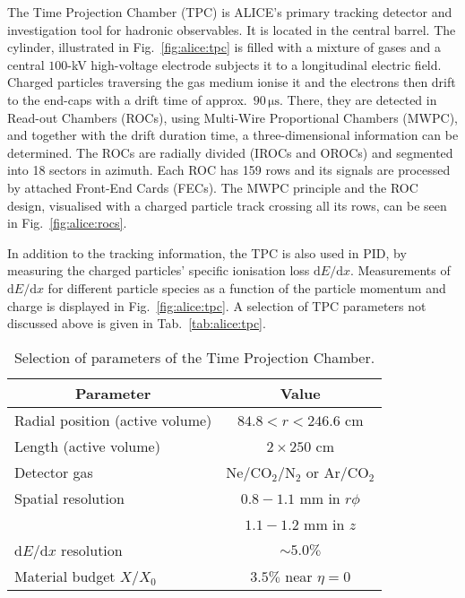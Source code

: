 The Time Projection Chamber (TPC) \cite{peskovTechnicalDesignReport2014} is ALICE's primary tracking detector and investigation tool for hadronic observables. It is located in the central barrel. The cylinder, illustrated in Fig.~\ref{fig:alice:tpc} is filled with a mixture of gases and a central $100$-kV high-voltage electrode subjects it to a longitudinal electric field. Charged particles traversing the gas medium ionise it and the electrons then drift to the end-caps with a drift time of approx.\ $90 \, \mathrm{\mu s}$. There, they are detected in Read-out Chambers (ROCs), using Multi-Wire Proportional Chambers (MWPC), and together with the drift duration time, a three-dimensional information can be determined. The ROCs are radially divided (IROCs and OROCs) and segmented into 18 sectors in azimuth. Each ROC has 159 rows and its signals are processed by attached Front-End Cards (FECs). The MWPC principle and the ROC design, visualised with a charged particle track crossing all its rows, can be seen in Fig.~\ref{fig:alice:rocs}.

In addition to the tracking information, the TPC is also used in PID, by measuring the charged particles' specific ionisation loss $\mathrm{d}E/\mathrm{d}x$. Measurements of $\mathrm{d}E/\mathrm{d}x$ for different particle species as a function of the particle momentum and charge is displayed in Fig.~\ref{fig:alice:tpc}. A selection of TPC parameters not discussed above is given in Tab.~\ref{tab:alice:tpc}.

\begin{table}[h!]
\centering
\caption{Selection of parameters of the Time Projection Chamber. \cite{collaborationALICEExperimentCERN2008} }
\label{tab:alice:alice}
\begin{tabular}{|cc|c|}
\hline
\multicolumn{2}{|c|}{\parbox[b][1.2em]{2em}{} Parameter} & Value \\ \hline
\multicolumn{2}{|l|}{\parbox[b][1.1em]{1em}{}Radial position (active volume)} &  $84.8<r<246.6$ cm\\ \hline
\multicolumn{2}{|l|}{\parbox[b][1.1em]{1em}{}Length (active volume)} &  $2\times250$ cm\\ \hline
\multicolumn{2}{|l|}{\parbox[b][1.1em]{1em}{}Detector gas} &  Ne/CO$_2$/N$_2$ or Ar/CO$_2$\\ \hline
\multicolumn{2}{|l|}{\parbox[b][1.1em]{1em}{}Spatial resolution} &  $0.8-1.1$ mm in $r\phi$\\
\multicolumn{2}{|l|}{\parbox[b][1.1em]{1em}{} } &  $1.1-1.2$ mm in $z$\\ \hline
\multicolumn{2}{|l|}{\parbox[b][1.1em]{1em}{}$\mathrm{d}E/\mathrm{d}x$ resolution} &  $\sim 5.0\%$\\ \hline
\multicolumn{2}{|l|}{\parbox[b][1.1em]{1em}{}Material budget $X/X_0$} &  $3.5\%$ near $\eta=0$\\ \hline
\end{tabular}
\end{table}

